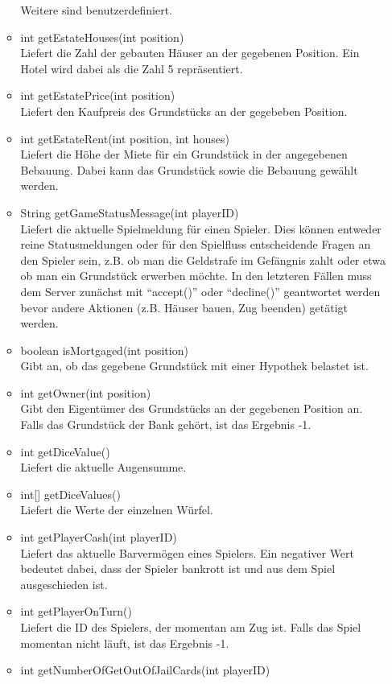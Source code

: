 \documentclass[a4paper,10pt]{article}
\begin{document}
\begin{itemize}
\begin{itemize}
\begin{description}
\end{description}
Weitere sind benutzerdefiniert.
\item int getEstateHouses(int position) \\
Liefert die Zahl der gebauten Häuser an der gegebenen Position. Ein Hotel wird dabei als die Zahl 5 repräsentiert.
\item int getEstatePrice(int position) \\
Liefert den Kaufpreis des Grundstücks an der gegebeben Position.
\item int getEstateRent(int position, int houses) \\
Liefert die Höhe der Miete für ein Grundstück in der angegebenen Bebauung. Dabei kann das Grundstück sowie die Bebauung gewählt werden.
\item String getGameStatusMessage(int playerID) \\
Liefert die aktuelle Spielmeldung für einen Spieler. Dies können entweder reine Statusmeldungen
oder für den Spielfluss entscheidende Fragen an den Spieler sein, z.B. ob man die Geldstrafe im Gefängnis zahlt oder etwa ob
man ein Grundstück erwerben möchte. In den letzteren Fällen muss dem Server zunächst mit "`accept()"' oder "`decline()"'
geantwortet werden bevor andere Aktionen (z.B. Häuser bauen, Zug beenden) getätigt werden.
\item boolean isMortgaged(int position) \\
Gibt an, ob das gegebene Grundstück mit einer Hypothek belastet ist.
\item int getOwner(int position) \\
Gibt den Eigentümer des Grundstücks an der gegebenen Position an. Falls das Grundstück der Bank gehört, ist das Ergebnis -1.
\item int getDiceValue() \\
Liefert die aktuelle Augensumme.
\item int[] getDiceValues() \\
Liefert die Werte der einzelnen Würfel.
\item int getPlayerCash(int playerID) \\
Liefert das aktuelle Barvermögen eines Spielers. Ein negativer Wert bedeutet dabei, dass der Spieler bankrott ist und aus dem Spiel ausgeschieden ist.
\item int getPlayerOnTurn() \\
Liefert die ID des Spielers, der momentan am Zug ist. Falls das Spiel
momentan nicht läuft, ist das Ergebnis -1.
\item int getNumberOfGetOutOfJailCards(int playerID) \\

\end{itemize}
\end{itemize}
\end{document}

